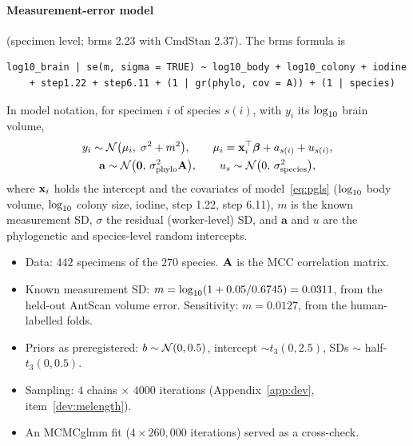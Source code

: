 \paragraph{Measurement-error model} (specimen level; brms 2.23 with CmdStan 2.37). The brms formula is
\begin{small}
\begin{verbatim}
log10_brain | se(m, sigma = TRUE) ~ log10_body + log10_colony + iodine
    + step1.22 + step6.11 + (1 | gr(phylo, cov = A)) + (1 | species)
\end{verbatim}
\end{small}
In model notation, for specimen $i$ of species $s(i)$, with $y_i$ its $\log_{10}$ brain volume,
\begin{equation}\label{eq:me}
\begin{gathered}
y_i \sim \mathcal{N}\bigl(\mu_i,\; \sigma^2 + m^2\bigr), \qquad
\mu_i = \mathbf{x}_i^{\top}\boldsymbol{\beta} + a_{s(i)} + u_{s(i)},\\
\mathbf{a} \sim \mathcal{N}\bigl(\mathbf{0},\, \sigma_{\mathrm{phylo}}^2\mathbf{A}\bigr), \qquad
u_s \sim \mathcal{N}\bigl(0,\, \sigma_{\mathrm{species}}^2\bigr),
\end{gathered}
\end{equation}
where $\mathbf{x}_i$ holds the intercept and the covariates of model~\eqref{eq:pgls} ($\log_{10}$ body volume, $\log_{10}$ colony
size, iodine, step 1.22, step 6.11), $m$ is the known measurement SD, $\sigma$ the residual (worker-level) SD, and
$\mathbf{a}$ and $u$ are the phylogenetic and species-level random intercepts.
\begin{itemize}[nosep]
\item Data: $442$ specimens of the $270$ species. $\mathbf{A}$ is the MCC correlation matrix.
\item Known measurement SD: $m = \log_{10}(1 + 0.05/0.6745) = 0.0311$, from the held-out AntScan volume error.
Sensitivity: $m = 0.0127$, from the human-labelled folds.
\item Priors as preregistered: $b \sim \mathcal{N}(0, 0.5)$, intercept $\sim t_3(0, 2.5)$, SDs $\sim$ half-$t_3(0, 0.5)$.
\item Sampling: $4$ chains $\times$ $4000$ iterations (Appendix~\ref{app:dev}, item~\ref{dev:melength}).
\item An MCMCglmm fit ($4 \times 260{,}000$ iterations) served as a cross-check.
\end{itemize}
